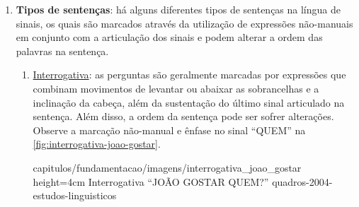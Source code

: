 \begin{enumerate}



    \item \textbf{Tipos de sentenças}: há alguns diferentes tipos de sentenças na língua de sinais, os quais são marcados através da utilização de expressões não-manuais em conjunto com a articulação dos sinais e podem alterar a ordem das palavras na sentença.
    

    \begin{enumerate}
        \item \underline{Interrogativa}: as perguntas são geralmente marcadas por expressões que combinam movimentos de levantar ou abaixar as sobrancelhas e a inclinação da cabeça, além da sustentação do último sinal articulado na sentença. Além disso, a ordem da sentença pode ser sofrer alterações. Observe a marcação não-manual e ênfase no sinal ``QUEM'' na \autoref{fig:interrogativa-joao-gostar}.
        
            {capitulos/fundamentacao/imagens/interrogativa_joao_gostar} %
            {height=4cm} %
            {Interrogativa ``JOÃO GOSTAR QUEM?''} %
            {quadros-2004-estudos-linguisticos} %
    


\end{enumerate}
\end{enumerate}
